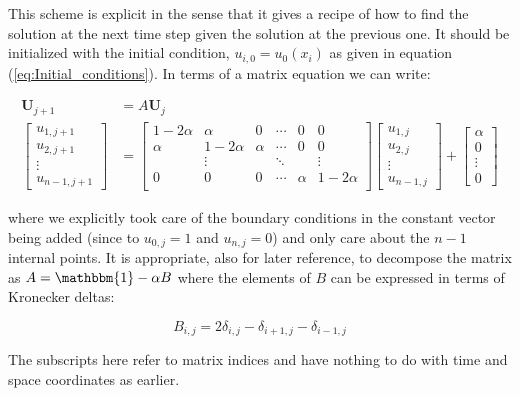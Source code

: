 \documentclass[a4paper, 11pt, notitlepage,english]{article}
\newcommand{\id}{\mathbbm{1}}
\begin{document}
This scheme is explicit in the sense that it gives a recipe of how to find the solution at the next time step given the solution at the previous one. It should be initialized with the initial condition, $u_{i,0} = u_0(x_i)$ as given in equation (\ref{eq:Initial_conditions}). In terms of a matrix equation we can write:

\begin{align}
\boldsymbol{U}_{j+1} &= A \boldsymbol{U}_j \\
\begin{bmatrix}
u_{1,j+1} \\ u_{2,j+1} \\ \vdots \\ u_{n-1,j+1}
\end{bmatrix}
&=
\begin{bmatrix}
 1-2\alpha & \alpha & 0 & \cdots & 0 & 0 \\
 \alpha & 1-2\alpha & \alpha & \cdots & 0 & 0 \\
  & \vdots & & \ddots & & \vdots \\
 0 & 0 & 0 & \cdots & \alpha & 1-2\alpha \\
\end{bmatrix}
\begin{bmatrix}
u_{1,j} \\ u_{2,j} \\ \vdots \\ u_{n-1,j}
\end{bmatrix}
+
\begin{bmatrix}
\alpha \\ 0 \\ \vdots \\ 0
\end{bmatrix}
\label{eq:Forward_Euler_matrix}
\end{align}

where we explicitly took care of the boundary conditions in the constant vector being added (since to $u_{0,j} = 1$ and $u_{n,j} = 0$) and only care about the $n-1$ internal points. It is appropriate, also for later reference, to decompose the matrix as $A = \id - \alpha B$ where the elements of $B$ can be expressed in terms of Kronecker deltas: 

\begin{equation}
B_{i,j} = 2\delta_{i,j}-\delta_{i+1,j}-\delta_{i-1,j}
\label{eq:Matrix_B}
\end{equation}

The subscripts here refer to matrix indices and have nothing to do with time and space coordinates as earlier. \\
\end{document}
